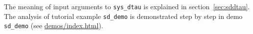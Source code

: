 \documentclass[10pt]{scrartcl}
\newcommand{\DDEBIFCODE}{\textsc{DDE-BIFTOOL}}
\newcommand{\demobase}{\url{demos/index.html}}
\newcommand{\blist}[1]{\mbox{\lstinline!#1!}}
\begin{document}
{

The meaning of input arguments to \blist{sys_dtau} is explained in
section~\ref{sec:sddtau}. The analysis of tutorial example
\blist{sd_demo} is demonstrated step by step in demo \texttt{sd\_demo}
(see \demobase{}).
 \newpage

}
\end{document}
